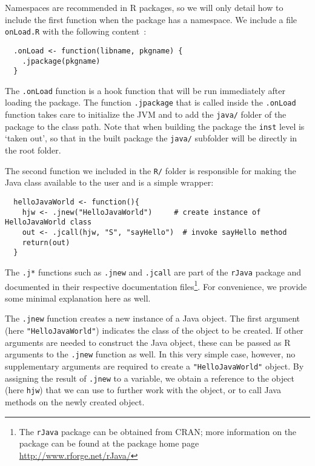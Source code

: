 \documentclass[a4paper, 11pt]{article}
\begin{document}
Namespaces are recommended in R packages, so we will only
detail how to include the first function when the package
has a namespace. We include a file \texttt{onLoad.R} with
the following content~:

\begin{verbatim}
  .onLoad <- function(libname, pkgname) {
    .jpackage(pkgname)
  }
\end{verbatim}

The \texttt{.onLoad} function is a hook function that
will be run immediately after loading the package.
The function \texttt{.jpackage} that is called inside
the \texttt{.onLoad} function takes care to initialize the JVM
and to add the \texttt{java/} folder of the package to the class path.
Note that when building the package the \verb|inst| level is `taken out', 
so that in the built package the \verb|java/| subfolder will be directly
in the root folder.

The second function we included in the \texttt{R/} folder is responsible
for making the Java class available to the user and is a simple 
wrapper:

\begin{verbatim}
  helloJavaWorld <- function(){
    hjw <- .jnew("HelloJavaWorld")     # create instance of HelloJavaWorld class
    out <- .jcall(hjw, "S", "sayHello")  # invoke sayHello method
    return(out)
  }
\end{verbatim}

The \texttt{.j*} functions such as \texttt{.jnew} and \texttt{.jcall}
are part of the \texttt{rJava} package and documented in their respective
documentation files\footnote{The \texttt{rJava} package can be obtained from 
CRAN; more information on the package can be found at the package home page 
\url{http://www.rforge.net/rJava/}}. For convenience, we provide some minimal
explanation here as well. 

The \texttt{.jnew} function creates a new instance
of a Java object. The first argument (here \texttt{"HelloJavaWorld"}) 
indicates the class of the object to be created. If other arguments are needed 
to construct the Java object, these can be passed as R arguments to the \texttt{.jnew} 
function as well. In this very simple case, however, no supplementary arguments are required 
to create a \texttt{"HelloJavaWorld"} object. By assigning the result of \texttt{.jnew} to
a variable, we obtain a reference to the object (here \texttt{hjw}) that we can use to
further work with the object, or to call Java methods on the newly created object.
\end{document}
